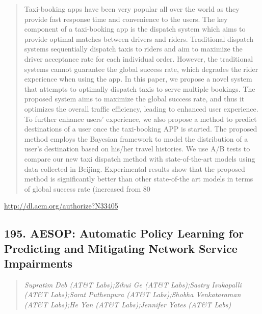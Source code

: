 \documentclass{article}
\begin{document}
\begin{quote}
Taxi-booking apps have been very popular all over the world as they provide fast response time and convenience to the users. The key component of a taxi-booking app is the dispatch system which aims to provide optimal matches between drivers and riders. Traditional dispatch systems sequentially dispatch taxis to riders and aim to maximize the driver acceptance rate for each individual order. However, the traditional systems cannot guarantee the global success rate, which degrades the rider experience when using the app. In this paper, we propose a novel system that attempts to optimally dispatch taxis to serve multiple bookings. The proposed system aims to maximize the global success rate, and thus it optimizes the overall traffic efficiency, leading to enhanced user experience. To further enhance users’ experience, we also propose a method to predict destinations of a user once the taxi-booking APP is started. The proposed method employs the Bayesian framework to model the distribution of a user’s destination based on his/her travel histories. We use A/B tests to compare our new taxi dispatch method with state-of-the-art models using data collected in Beijing. Experimental results show that the proposed method is significantly better than other state-of-the art models in terms of global success rate (increased from 80%
\end{quote}

\href{http://dl.acm.org/authorize?N33405}{http://dl.acm.org/authorize?N33405}

\subsection{195. AESOP: Automatic Policy Learning for Predicting and Mitigating Network Service Impairments}

\begin{quote}
\footnotesize{\textit{Supratim Deb (AT\&T Labs);Zihui Ge (AT\&T Labs);Sastry Isukapalli (AT\&T Labs);Sarat Puthenpura (AT\&T Labs);Shobha Venkataraman (AT\&T Labs);He Yan (AT\&T Labs);Jennifer Yates (AT\&T Labs)}}

\end{quote}
\end{document}
